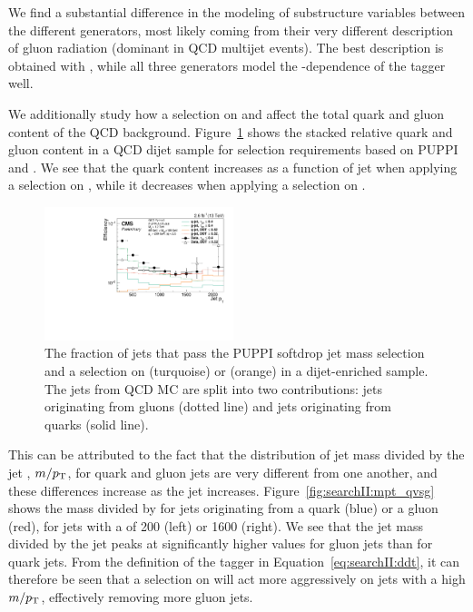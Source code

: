 We find a substantial difference in the modeling of substructure variables between the different generators, most likely coming from their very different description of gluon radiation (dominant in QCD multijet events).
The best description is obtained with \HERWIG{++}, while all three generators model the \PT-dependence of the tagger well.\par
We additionally study how a selection on \nsubj and \ddt affect the total quark and gluon content of the QCD background. Figure~\ref{fig:searchII:qgfakerate} shows the stacked relative quark and gluon content in a  QCD dijet sample for selection requirements based on PUPPI \nsubj and \ddt. We see that the quark content increases as a function of jet \PT when applying a selection on \ddt, while it decreases when applying a selection on \nsubj.
\begin{figure}[h!]
\centering
\includegraphics[width=0.49\textwidth]{figures/vtagging/JME-16-003/BoostedW/qgFakeRate_Pythia8_pT.pdf}
\caption{ 
The fraction of jets that pass the PUPPI softdrop jet mass selection and a selection on \nsubj (turquoise) or \ddt (orange) in a dijet-enriched sample. The jets from QCD MC are split into two contributions: jets originating from gluons (dotted line) and jets originating from quarks (solid line).}
\label{fig:searchII:qgfakerate}
\end{figure}
 This can be attributed to the fact that the distribution of jet mass divided by the jet \PT, $m/p_{\mathrm{T}}$, for quark and gluon jets are very different from one another, and these differences increase as the jet \PT increases. Figure~\ref{fig:searchII:mpt_qvsg} shows the mass divided by \PT for jets originating from a quark (blue) or a gluon (red), for jets with a \PT of 200 \GeV (left) or 1600 \GeV (right). We see that the jet mass divided by the jet \PT peaks at significantly higher values for gluon jets than for quark jets. From the definition of the \ddt tagger in Equation~\ref{eq:searchII:ddt}, it can therefore be seen that a selection on \ddt will act more aggressively on jets with a high $m/p_{\mathrm{T}}$, effectively removing more gluon jets.
